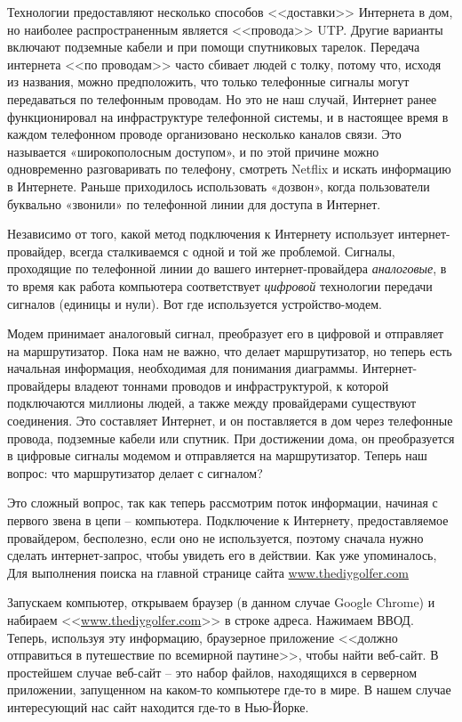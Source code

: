 \documentclass[a4paper,12pt,final,openany]{extbook}
\begin{document}
Технологии предоставляют несколько способов <<доставки>> Интернета в дом,
но наиболее распространенным является <<провода>> UTP. Другие варианты
включают подземные кабели и при помощи спутниковых тарелок. Передача интернета <<по
проводам>> часто сбивает людей с толку, потому что, исходя из названия,
можно предположить, что только телефонные сигналы могут передаваться по
телефонным проводам. Но это не наш случай, Интернет ранее функционировал
на инфраструктуре телефонной системы, и в настоящее время в каждом телефонном проводе организовано несколько каналов связи. Это называется «широкополосным доступом», и по этой причине можно одновременно разговаривать по телефону, смотреть Netflix и искать информацию в Интернете. Раньше приходилось использовать «дозвон», когда пользователи
буквально «звонили» по телефонной линии для доступа в Интернет.

Независимо от того, какой метод подключения к Интернету использует интернет-провайдер, всегда сталкиваемся с одной и той же проблемой.
Сигналы, проходящие по телефонной линии до вашего интернет-провайдера
\emph{аналоговые}, в то время как работа компьютера соответствует
\emph{цифровой} технологии передачи сигналов (единицы и нули). Вот где
используется устройство-модем.

Модем принимает аналоговый сигнал, преобразует его в цифровой и
отправляет на маршрутизатор. Пока нам не важно, что делает
маршрутизатор, но теперь есть начальная информация, необходимая для
понимания диаграммы. Интернет-провайдеры владеют тоннами проводов и
инфраструктурой, к которой подключаются миллионы людей, а также между
провайдерами существуют соединения. Это составляет Интернет, и он
поставляется в дом через телефонные провода, подземные кабели или
спутник. При достижении дома, он преобразуется в цифровые сигналы модемом
и отправляется на маршрутизатор. Теперь наш вопрос: что маршрутизатор
делает с сигналом?

Это сложный вопрос, так как теперь рассмотрим поток информации, начиная
с первого звена в цепи -- компьютера. Подключение к Интернету,
предоставляемое провайдером, бесполезно, если оно не используется,
поэтому сначала нужно сделать интернет-запрос, чтобы увидеть его в действии. Как уже упоминалось, Для выполнения поиска на главной странице
сайта \href{http://www.thediygolfer.com}{www.thediygolfer.com}

Запускаем компьютер, открываем браузер (в данном случае Google Chrome) и
набираем <<\href{http://www.thediygolfer.com}{www.thediygolfer.com}>> в
строке адреса. Нажимаем ВВОД. Теперь, используя эту информацию,
браузерное приложение <<должно отправиться в путешествие по всемирной
паутине>>, чтобы найти веб-сайт. В простейшем случае веб-сайт -- это набор файлов, находящихся
в серверном приложении, запущенном на каком-то компьютере где-то в мире.
В нашем случае интересующий нас сайт находится где-то в Нью-Йорке.
\end{document}
